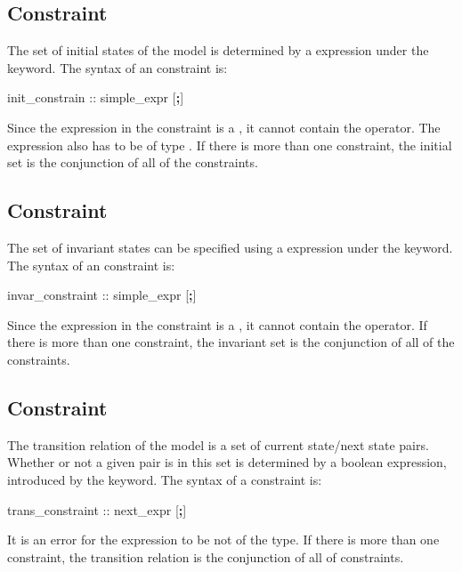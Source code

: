 \subsection{ Constraint}
\label{INIT Constraint}
%
The set of initial states of the model is determined by a \Boolean
expression under the  keyword.
%
The syntax of an  constraint is:
%
\begin{Grammar}
init_constrain ::  simple_expr [\textbf{;}]
\end{Grammar}
%
Since the expression in the  constraint is a
, it cannot contain the 
operator.
%
The expression also has to be of type \Boolean.
%
If there is more than one  constraint, the initial set is
the conjunction of all of the  constraints.

\subsection{ Constraint}
\label{INVAR Constraint}
%
The set of invariant states can be specified using a \Boolean
expression under the  keyword.
%
The syntax of an  constraint is:
%
\begin{Grammar}
invar_constraint ::  simple_expr [\textbf{;}]
\end{Grammar}
%
Since the expression in the  constraint is a
, it cannot contain the 
operator. 
%
If there is more than one  constraint, the invariant set
is the conjunction of all of the  constraints.

\subsection{ Constraint}
\label{TRANS Constraint}
%
The transition relation of the model is a set of current state/next
state pairs. 
%
Whether or not a given pair is in this set is determined by a boolean
expression, introduced by the  keyword. 
%
The syntax of a  constraint is:
%
\begin{Grammar}
trans_constraint ::  next_expr [\textbf{;}]
\end{Grammar}
%
It is an error for the expression to be not of the \Boolean type.
%
If there is more than one  constraint, the transition
relation is the conjunction of all of  constraints.

